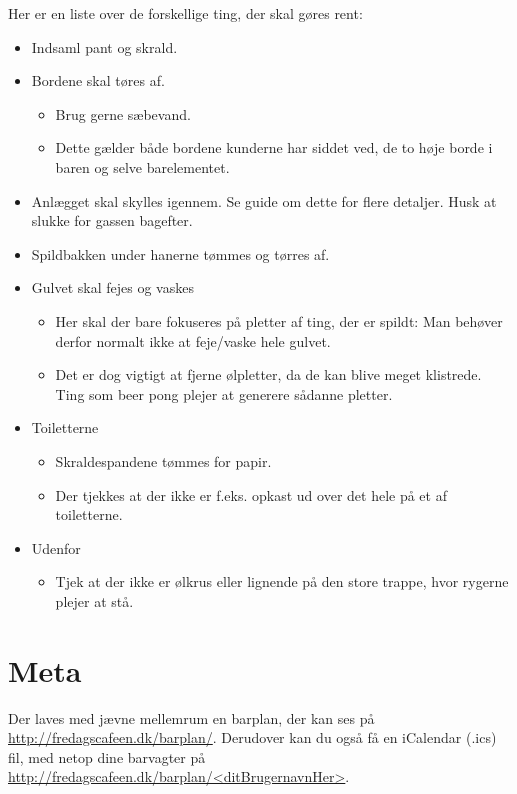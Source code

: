 Her er en liste over de forskellige ting, der skal gøres rent:
\begin{itemize}
\item Indsaml pant og skrald.
\item Bordene skal tøres af.
  \begin{itemize}
  \item Brug gerne sæbevand.
  \item Dette gælder både bordene kunderne har siddet ved, de to høje
    borde i baren og selve barelementet.
  \end{itemize}
\item Anlægget skal skylles igennem. Se guide om dette for flere
  detaljer. Husk at slukke for gassen bagefter.
\item Spildbakken under hanerne tømmes og tørres af.
\item Gulvet skal fejes og vaskes
  \begin{itemize}
  \item Her skal der bare fokuseres på pletter af ting, der er spildt:
    Man behøver derfor normalt ikke at feje/vaske hele gulvet.
  \item Det er dog vigtigt at fjerne ølpletter, da de kan blive meget
    klistrede. Ting som beer pong plejer at generere sådanne pletter.
  \end{itemize}
\item Toiletterne
  \begin{itemize}
  \item Skraldespandene tømmes for papir.
  \item Der tjekkes at der ikke er f.eks. opkast ud over det hele på
    et af toiletterne.
  \end{itemize}
\item Udenfor
  \begin{itemize}
  \item Tjek at der ikke er ølkrus eller lignende på den store trappe,
    hvor rygerne plejer at stå.
  \end{itemize}
\end{itemize}

\section{Meta}
\label{sec:meta}

Der laves med jævne mellemrum en barplan, der kan ses på
\url{http://fredagscafeen.dk/barplan/}. Derudover kan du også få en
iCalendar (.ics) fil, med netop dine barvagter på
\url{http://fredagscafeen.dk/barplan/<ditBrugernavnHer>}.

